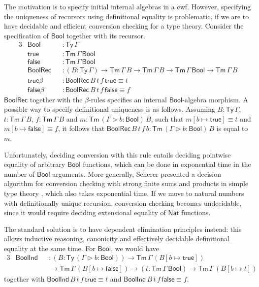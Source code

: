 \documentclass[12pt,a4paper,twoside,openany]{book}
\theoremstyle{remark}
\theoremstyle{definition}
\theoremstyle{theorem}
\newcommand{\ms}[1]{\mathsf{#1}}
\newcommand{\Tm}{\mathsf{Tm}}
\newcommand{\Ty}{\mathsf{Ty}}
\newcommand{\ext}{\triangleright}
\newcommand{\Nat}{\ms{Nat}}
\newcommand{\Bool}{\ms{Bool}}
\newcommand{\true}{\ms{true}}
\newcommand{\false}{\ms{false}}
\begin{document}
The motivation is to specify initial internal algebras in a cwf. However,
specifying the uniqueness of recursors using definitional equality is
problematic, if we are to have decidable and efficient conversion checking for a
type theory. Consider the specification of $\Bool$ together with its recursor.
\begingroup
\allowdisplaybreaks
\begin{alignat*}{3}
  & \Bool  &&: \Ty\,\Gamma \\
  & \true  &&: \Tm\,\Gamma\,\Bool \\
  & \false &&: \Tm\,\Gamma\,\Bool \\
  & \ms{BoolRec} &&: (B : \Ty\,\Gamma)\to \Tm\,\Gamma\,B \to \Tm\,\Gamma\,B \to \Tm\,\Gamma\,\Bool \to \Tm\,\Gamma\,B\\
  & \true\beta &&: \ms{BoolRec}\,B\,t\,f\,\true \equiv t\\
  & \false\beta &&: \ms{BoolRec}\,B\,t\,f\,\false \equiv f
\end{alignat*}
\endgroup
$\ms{BoolRec}$ together with the $\beta$-rules specifies an internal
$\Bool$-algebra morphism. A possible way to specify definitional uniqueness is
as follows. Assuming $B : \Ty\,\Gamma$, $t : \Tm\,\Gamma\,B$, $f :
\Tm\,\Gamma\,B$ and $m : \Tm\,(\Gamma\ext b : \Bool)\,B$, such that $m[b \mapsto
  \true] \equiv t$ and $m[b \mapsto \false] \equiv f$, it follows that
$\ms{BoolRec}\,B\,t\,f\,b : \Tm\,(\Gamma\ext b : \Bool)\,B$ is equal to $m$.

Unfortunately, deciding conversion with this rule entails deciding pointwise
equality of arbitrary $\Bool$ functions, which can be done in exponential time
in the number of $\Bool$ arguments. More generally, Scherer presented a decision
algorithm for conversion checking with strong finite sums and products in simple
type theory \cite{scherer17deciding}, which also takes exponential time. If we
move to natural numbers with definitionally unique recursion, conversion
checking becomes undecidable, since it would require deciding extensional
equality of $\Nat$ functions.

The standard solution is to have dependent elimination principles instead: this
allows inductive reasoning, canonicity and effectively decidable definitional
equality at the same time. For $\Bool$, we would have
\begin{alignat*}{3}
  & \ms{BoolInd} &&: (B : \Ty\,(\Gamma\ext b : \Bool)) \to \Tm\,\Gamma\,(B[b \mapsto \true])\\
  & &&\to \Tm\,\Gamma\,(B[b \mapsto \false]) \to (t : \Tm\,\Gamma\,\Bool) \to \Tm\,\Gamma\,(B[b \mapsto t])
\end{alignat*}
together with $\ms{BoolInd}\,B\,t\,f\,\true \equiv t$ and $\ms{BoolInd}\,B\,t\,f\,\false \equiv f$.
\end{document}
